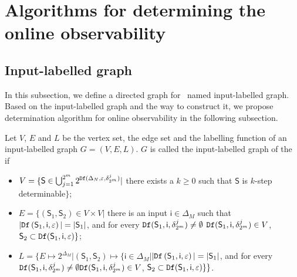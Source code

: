 \section{Algorithms for determining the online observability}
\label{sec:deter}


\subsection{Input-labelled graph}
In this subsection, we define a directed graph for \BCN\ named input-labelled graph. Based on the input-labelled graph and the way to construct it, we propose determination algorithm for online observability in the following subsection.

\begin{definition}
Let $V$, $E$ and $L$ be the vertex set, the edge set and the labelling function of an input-labelled graph $G=(V, E, L)$. $G$ is called the input-labelled graph of the \BCN\, if 
\begin{itemize}
\item  $V=\{\mathsf{S}\in\bigcup_{j=1}^{2^m} 2^{{\tt Df}(\Delta_N,\varepsilon,\delta^j_{2^m} )}|$ there exists a $k\ge0$ such that $\mathsf{S}$ is $k$-step determinable$\}$;
\item  $E=\{(\mathsf{S}_1,\mathsf{S}_2)\in V\times V|$ there is an input $\mathsf{i} \in \Delta_M$ such that $|{\tt Df}\left(\mathsf{S}_1,\mathsf{i},\varepsilon\right)|=|\mathsf{S}_1|$, and for every ${\tt Df}(\mathsf{S}_1,\mathsf{i},\delta^j_{2^m})\neq \emptyset$ ${\tt Df}(\mathsf{S}_1,\mathsf{i},\delta^j_{2^m})\in V$, $\mathsf{S}_2\subset{\tt Df}(\mathsf{S}_1,\mathsf{i},\varepsilon)\}$;
\item  $L=\{E\mapsto 2^{\Delta_M}|(\mathsf{S}_1,\mathsf{S}_2)\mapsto\{\mathsf{i}\in \Delta_M|$$|{\tt Df}\left(\mathsf{S}_1,\mathsf{i},\varepsilon\right)|=|\mathsf{S}_1|$, and for every ${\tt Df}(\mathsf{S}_1,\mathsf{i},\delta^j_{2^m})\neq \emptyset{\tt Df}(\mathsf{S}_1,\mathsf{i},\delta^j_{2^m})\in V$, $\mathsf{S}_2\subset{\tt Df}(\mathsf{S}_1,\mathsf{i},\varepsilon)\}\}$.
 \end{itemize}

\end{definition}

